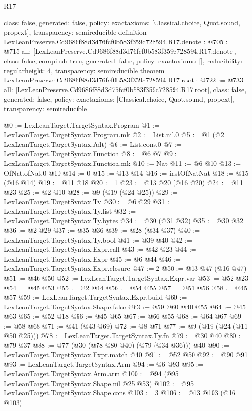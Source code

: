 \begin{lexlean}{R17}
\begin{coremodule}
{  class: false,
  generated: false,
  policy: exact{axioms: [Classical.choice, Quot.sound, propext]},
  transparency: semireducible
}
definition LexLeanPreserve.Cd9686f88d3d76fcf0b583f359c728594.R17.denote : @705 := @715 {
  all: [LexLeanPreserve.Cd9686f88d3d76fcf0b583f359c728594.R17.denote],
  class: false,
  compiled: true,
  generated: false,
  policy: exact{axioms: []},
  reducibility: regular{height: 4},
  transparency: semireducible
}
theorem LexLeanPreserve.Cd9686f88d3d76fcf0b583f359c728594.R17.root : @722 := @733 {
  all: [LexLeanPreserve.Cd9686f88d3d76fcf0b583f359c728594.R17.root],
  class: false,
  generated: false,
  policy: exact{axioms: [Classical.choice, Quot.sound, propext]},
  transparency: semireducible
}

@0 := LexLeanTarget.TargetSyntax.Program
@1 := LexLeanTarget.TargetSyntax.Program.mk
@2 := List.nil.{0}
@5 := @1 (@2 LexLeanTarget.TargetSyntax.Adt)
@6 := List.cons.{0}
@7 := LexLeanTarget.TargetSyntax.Function
@8 := @6 @7
@9 := LexLeanTarget.TargetSyntax.Function.mk
@10 := Nat
@11 := @6 @10
@13 := OfNat.ofNat.{0} @10
@14 := 0
@15 := @13 @14
@16 := instOfNatNat
@18 := @15 (@16 @14)
@19 := @11 @18
@20 := 1
@23 := @13 @20 (@16 @20)
@24 := @11 @23
@25 := @2 @10
@28 := @9 (@19 (@24 @25))
@29 := LexLeanTarget.TargetSyntax.Ty
@30 := @6 @29
@31 := LexLeanTarget.TargetSyntax.Ty.list
@32 := LexLeanTarget.TargetSyntax.Ty.bytes
@34 := @30 (@31 @32)
@35 := @30 @32
@36 := @2 @29
@37 := @35 @36
@39 := @28 (@34 @37)
@40 := LexLeanTarget.TargetSyntax.Ty.bool
@41 := @39 @40
@42 := LexLeanTarget.TargetSyntax.Expr.call
@43 := @42 @23
@44 := LexLeanTarget.TargetSyntax.Expr
@45 := @6 @44
@46 := LexLeanTarget.TargetSyntax.Expr.closure
@47 := 2
@50 := @13 @47 (@16 @47)
@51 := @46 @50
@52 := LexLeanTarget.TargetSyntax.Expr.var
@53 := @52 @23
@54 := @45 @53
@55 := @2 @44
@56 := @54 @55
@57 := @51 @56
@58 := @45 @57
@59 := LexLeanTarget.TargetSyntax.Expr.build
@60 := LexLeanTarget.TargetSyntax.Shape.false
@63 := @59 @60 @40 @55
@64 := @45 @63
@65 := @52 @18
@66 := @45 @65
@67 := @66 @55
@68 := @64 @67
@69 := @58 @68
@71 := @41 (@43 @69)
@72 := @8 @71
@77 := @9 (@19 (@24 (@11 @50 @25)))
@78 := LexLeanTarget.TargetSyntax.Ty.fn
@79 := @30 @40
@80 := @79 @37
@88 := @77 (@30 (@78 @80 @40) (@79 (@34 @36))) @40
@90 := LexLeanTarget.TargetSyntax.Expr.match @40
@91 := @52 @50
@92 := @90 @91
@93 := LexLeanTarget.TargetSyntax.Arm
@94 := @6 @93
@95 := LexLeanTarget.TargetSyntax.Arm.arm
@100 := @94 (@95 LexLeanTarget.TargetSyntax.Shape.nil @25 @53)
@102 := @95 LexLeanTarget.TargetSyntax.Shape.cons
@103 := 3
@106 := @13 @103 (@16 @103)

\end{coremodule}
\end{lexlean}
